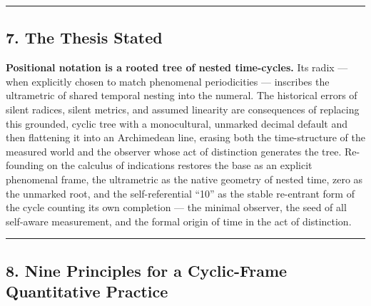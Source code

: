\documentclass[
]{article}
\begin{document}
\begin{center}\rule{0.5\linewidth}{0.5pt}\end{center}

\subsection{7. The Thesis Stated}\label{the-thesis-stated}

\textbf{Positional notation is a rooted tree of nested time-cycles.} Its
radix --- when explicitly chosen to match phenomenal periodicities ---
inscribes the ultrametric of shared temporal nesting into the numeral.
The historical errors of silent radices, silent metrics, and assumed
linearity are consequences of replacing this grounded, cyclic tree with
a monocultural, unmarked decimal default and then flattening it into an
Archimedean line, erasing both the time-structure of the measured world
and the observer whose act of distinction generates the tree.
Re-founding on the calculus of indications restores the base as an
explicit phenomenal frame, the ultrametric as the native geometry of
nested time, zero as the unmarked root, and the self-referential ``10''
as the stable re-entrant form of the cycle counting its own completion
--- the minimal observer, the seed of all self-aware measurement, and
the formal origin of time in the act of distinction.

\begin{center}\rule{0.5\linewidth}{0.5pt}\end{center}

\subsection{8. Nine Principles for a Cyclic-Frame Quantitative
Practice}\label{nine-principles-for-a-cyclic-frame-quantitative-practice}
\end{document}
